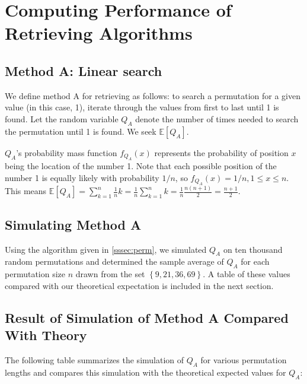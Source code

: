 \documentclass[11pt, oneside]{article}   	%
\begin{document}
\section{Computing Performance of Retrieving Algorithms}
\subsection{Method A: Linear search}
We define method A for retrieving as follows: to search a permutation for a given value (in this case, 1), iterate through the values from first to last until 1 is found. Let the random variable $Q_A$ denote the number of times needed to search the permutation until 1 is found. We seek $\mathbb{E}[Q_A]$.

$Q_A$'s probability mass function $f_{Q_A}(x)$ represents the probability of position $x$ being the location of the number 1. Note that each possible position of the number 1 is equally likely with probability $1 / n$, so $f_{Q_A}(x) = 1 / n, 1 \leq x \leq n$. This means $\mathbb{E}[Q_A] = \sum_{k=1}^{n} \frac{1}{n} k = \frac{1}{n} \sum_{k = 1}^{n} k = \frac{1}{n} \frac{n (n + 1)}{2} = \frac{n + 1}{2}$.
\subsection{Simulating Method A}
Using the algorithm given in \ref{sssec:perm}, we simulated $Q_A$ on ten thousand random permutations and determined the sample average of $Q_A$ for each permutation size $n$ drawn from the set $\left\{9, 21, 36, 69\right\}$. A table of these values compared with our theoretical expectation is included in the next section.

\subsection{Result of Simulation of Method A Compared With Theory}
The following table summarizes the simulation of $Q_{A}$ for various permutation lengths and compares this simulation with the theoretical expected values for $Q_{A}$:\\
\end{document}
